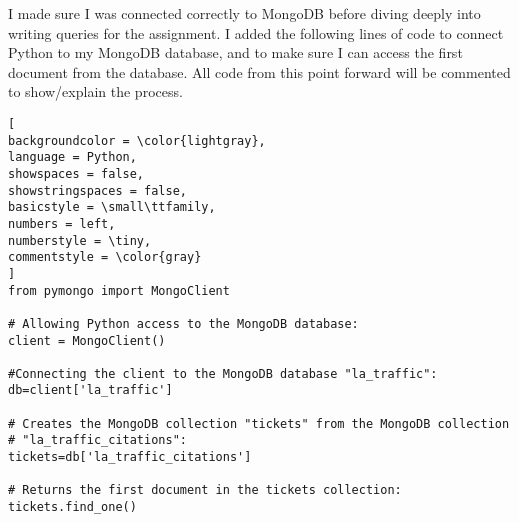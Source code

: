 \documentclass[]{article}
\begin{document}
I made sure I was connected correctly to MongoDB before diving deeply into writing queries for the assignment.  I added the following lines of code to connect Python to my MongoDB database, and to make sure I can access the first document from the database.  All code from this point forward will be commented to show/explain the process.

\begin{lstlisting}[
backgroundcolor = \color{lightgray},
language = Python,
showspaces = false,
showstringspaces = false,
basicstyle = \small\ttfamily,
numbers = left,
numberstyle = \tiny,
commentstyle = \color{gray}
]
from pymongo import MongoClient

# Allowing Python access to the MongoDB database:
client = MongoClient()

#Connecting the client to the MongoDB database "la_traffic":
db=client['la_traffic']

# Creates the MongoDB collection "tickets" from the MongoDB collection 
# "la_traffic_citations":
tickets=db['la_traffic_citations']

# Returns the first document in the tickets collection:
tickets.find_one()
\end{lstlisting}
\end{document}
